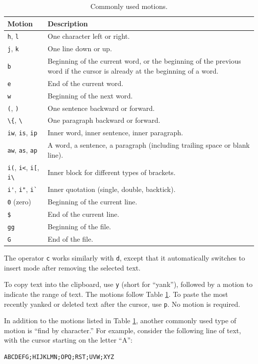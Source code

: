 \begin{table}[!htb]
\centering \caption{Commonly used motions.}\label{ch:tfe:tab:motion}
\begin{tabularx}{\textwidth}{lX}
	\hline
	Motion & Description \\ \hline
	\verb|h|, \verb|l| & One character left or right. \\ 
	\verb|j|, \verb|k| & One line down or up. \\ 
	\verb|b| & Beginning of the current word, or the beginning of the previous word if the cursor is already at the beginning of a word. \\ 
	\verb|e| & End of the current word. \\ 
	\verb|w| & Beginning of the next word. \\ 
	\verb|(|, \verb|)| & One sentence backward or forward. \\ 
	\lstinline{\{}, \lstinline{\}} & One paragraph backward or forward. \\ 
	\verb|iw|, \verb|is|, \verb|ip| & Inner word, inner sentence, inner paragraph. \\ 
	\verb|aw|, \verb|as|, \verb|ap| & A word, a sentence, a paragraph (including trailing space or blank line). \\ 
	\verb|i(|, \verb|i<|, \verb|i[|, \verb|i|\lstinline{\}} & Inner block for different types of brackets. \\
	\verb|i'|, \verb|i"|, \verb|i`| & Inner quotation (single, double, backtick). \\ 
	\verb|0| (zero) & Beginning of the current line. \\ 
	\verb|$| & End of the current line. \\ 
	\verb|gg| & Beginning of the file. \\ 
	\verb|G| & End of the file. \\
	\hline
\end{tabularx}
\end{table}

The operator \verb|c| works similarly with \verb|d|, except that it automatically switches to insert mode after removing the selected text. 

To copy text into the clipboard, use \verb|y| (short for ``yank''), followed by a motion to indicate the range of text. The motions follow Table \ref{ch:tfe:tab:motion}. To paste the most recently yanked or deleted text after the cursor, use \verb|p|. No motion is required.

In addition to the motions listed in Table \ref{ch:tfe:tab:motion}, another commonly used type of motion is ``find by character.'' For example, consider the following line of text, with the cursor starting on the letter ``A'':
\begin{lstlisting}
ABCDEFG;HIJKLMN;OPQ;RST;UVW;XYZ
\end{lstlisting}

